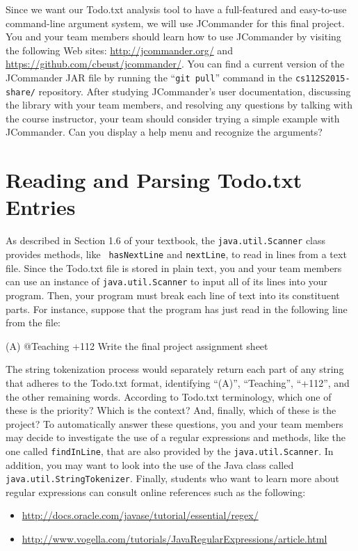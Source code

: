 Since we want our Todo.txt analysis tool to have a full-featured and easy-to-use command-line argument system, we will
use JCommander for this final project.  You and your team members should learn how to use JCommander by visiting the
following Web sites: \url{http://jcommander.org/} and \url{https://github.com/cbeust/jcommander/}. You can find a
current version of the JCommander JAR file by running the ``{\tt git pull}'' command in the {\tt cs112S2015-share/}
repository.  After studying JCommander's user documentation, discussing the library with your team members, and
resolving any questions by talking with the course instructor, your team should consider trying a simple example with
JCommander. Can you display a help menu and recognize the arguments?

\section*{Reading and Parsing Todo.txt Entries}

  As described in Section 1.6 of your textbook, the {\tt java.util.Scanner} class provides methods, like {\tt
  hasNextLine} and {\tt nextLine}, to read in lines from a text file.  Since the Todo.txt file is stored in plain text,
  you and your team members can use an instance of {\tt java.util.Scanner} to input all of its lines into your program.
  Then, your program must break each line of text into its constituent parts.  For instance, suppose that the program
  has just read in the following line from the file:

  (A) @Teaching +112 Write the final project assignment sheet

  The string tokenization process would separately return each part of any string that adheres to the Todo.txt format,
  identifying ``(A)'', ``Teaching'', ``+112'', and the other remaining words. According to Todo.txt terminology, which
  one of these is the priority?  Which is the context?  And, finally, which of these is the project?  To automatically
  answer these questions, you and your team members may decide to investigate the use of a regular expressions and
  methods, like the one called {\tt findInLine}, that are also provided by the {\tt java.util.Scanner}. In addition, you
  may want to look into the use of the Java class called {\tt java.util.StringTokenizer}. Finally, students who want to
  learn more about regular expressions can consult online references such as the following:

  \vspace*{-.25in}
  \begin{itemize}
    \itemsep0in
    \item \url{http://docs.oracle.com/javase/tutorial/essential/regex/}
    \item \url{http://www.vogella.com/tutorials/JavaRegularExpressions/article.html}
  \end{itemize}

